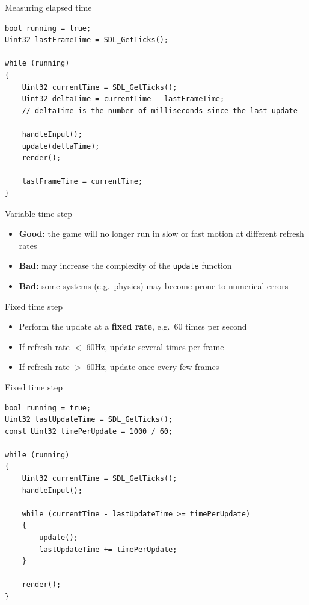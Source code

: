 \begin{frame}[fragile]{Measuring elapsed time}
    \begin{lstlisting}
bool running = true;
Uint32 lastFrameTime = SDL_GetTicks();

while (running)
{
    Uint32 currentTime = SDL_GetTicks();
    Uint32 deltaTime = currentTime - lastFrameTime;
    // deltaTime is the number of milliseconds since the last update
    
    handleInput();
    update(deltaTime);
    render();
    
    lastFrameTime = currentTime;
}
    \end{lstlisting}
\end{frame}

\begin{frame}{Variable time step}
    \begin{itemize}
        \item \textbf{Good:} the game will no longer run in slow or fast motion at different refresh rates
        \item \textbf{Bad:} may increase the complexity of the \lstinline{update} function
        \item \textbf{Bad:} some systems (e.g.\ physics) may become prone to numerical errors
    \end{itemize}
\end{frame}

\begin{frame}{Fixed time step}
    \begin{itemize}
        \item Perform the update at a \textbf{fixed rate}, e.g.\ 60 times per second
        \item If refresh rate $<$ 60Hz, update several times per frame
        \item If refresh rate $>$ 60Hz, update once every few frames
    \end{itemize}
\end{frame}

\begin{frame}[fragile]{Fixed time step}
    \begin{lstlisting}
bool running = true;
Uint32 lastUpdateTime = SDL_GetTicks();
const Uint32 timePerUpdate = 1000 / 60;

while (running)
{
    Uint32 currentTime = SDL_GetTicks();
    handleInput();
    
    while (currentTime - lastUpdateTime >= timePerUpdate)
    {
        update();
        lastUpdateTime += timePerUpdate;
    }
    
    render();
}
    \end{lstlisting}
\end{frame}

